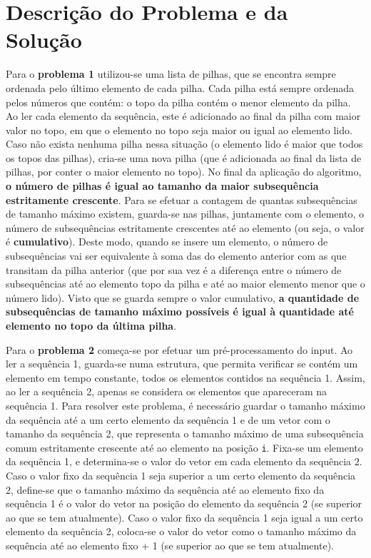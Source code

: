 \documentclass[12pt,a4paper]{article}
\begin{document}
  \section{Descrição do Problema e da Solução}

  Para o \textbf{problema 1} utilizou-se uma lista de pilhas, que se encontra sempre ordenada pelo último elemento de cada pilha. \cite{aldous-1999}
  Cada pilha está sempre ordenada pelos números que contém: o topo da pilha contém o menor elemento da pilha.
  Ao ler cada elemento da sequência, este é adicionado ao final da pilha com maior valor no topo, em que o elemento no topo seja maior ou igual ao elemento lido.
  Caso não exista nenhuma pilha nessa situação (o elemento lido é maior que todos os topos das pilhas), cria-se uma nova pilha (que é adicionada ao final da lista de pilhas, por conter o maior elemento no topo).
  No final da aplicação do algoritmo, \textbf{o número de pilhas é igual ao tamanho da maior subsequência estritamente crescente}.
  Para se efetuar a contagem de quantas subsequências de tamanho máximo existem, guarda-se nas pilhas, juntamente com o elemento, o número de subsequências estritamente crescentes até ao elemento (ou seja, o valor é \textbf{cumulativo}).
  Deste modo, quando se insere um elemento, o número de subsequências vai ser equivalente à soma das do elemento anterior com as que transitam da pilha anterior (que por sua vez é a diferença entre o número de subsequências até ao elemento topo da pilha e até ao maior elemento menor que o número lido).
  Visto que se guarda sempre o valor cumulativo, \textbf{a quantidade de subsequências de tamanho máximo possíveis é igual à quantidade até elemento no topo da última pilha}.

  Para o \textbf{problema 2} começa-se por efetuar um pré-processamento do input.
  Ao ler a sequência 1, guarda-se numa estrutura, que permita verificar se contém um elemento em tempo constante, todos os elementos contidos na sequência 1.
  Assim, ao ler a sequência 2, apenas se considera os elementos que apareceram na sequência 1.
  Para resolver este problema, é necessário guardar o tamanho máximo da sequência até a um certo elemento da sequência 1 e de um vetor com o tamanho da sequência 2, que representa o tamanho máximo de uma subsequência comum estritamente crescente até ao elemento na posição \texttt{i}.
  Fixa-se um elemento da sequência 1, e determina-se o valor do vetor em cada elemento da sequência 2.
  Caso o valor fixo da sequência 1 seja superior a um certo elemento da sequência 2, define-se que o tamanho máximo da sequência até ao elemento fixo da sequência 1 é o valor do vetor na posição do elemento da sequência 2 (se superior ao que se tem atualmente).
  Caso o valor fixo da sequência 1 seja igual a um certo elemento da sequência 2, coloca-se o valor do vetor como o tamanho máximo da sequência até ao elemento fixo + 1 (se superior ao que se tem atualmente). \cite{DBLP:journals/corr/Zhu0WW16}
\end{document}
